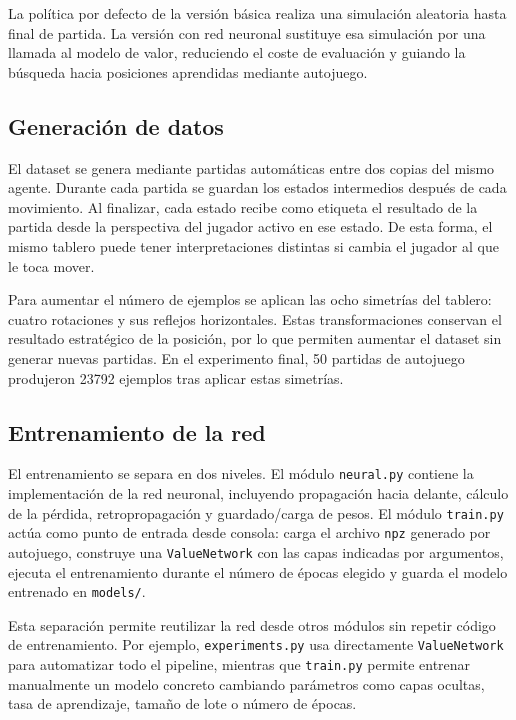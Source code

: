 \documentclass[conference,a4paper]{IEEEtran}
\begin{document}
La política por defecto de la versión básica realiza una simulación aleatoria
hasta final de partida. La versión con red neuronal sustituye esa simulación por
una llamada al modelo de valor, reduciendo el coste de evaluación y guiando la
búsqueda hacia posiciones aprendidas mediante autojuego.

\subsection{Generación de datos}

El dataset se genera mediante partidas automáticas entre dos copias del mismo
agente. Durante cada partida se guardan los estados intermedios después de cada
movimiento. Al finalizar, cada estado recibe como etiqueta el resultado de la
partida desde la perspectiva del jugador activo en ese estado. De esta forma, el
mismo tablero puede tener interpretaciones distintas si cambia el jugador al que
le toca mover.

Para aumentar el número de ejemplos se aplican las ocho simetrías del tablero:
cuatro rotaciones y sus reflejos horizontales. Estas transformaciones conservan
el resultado estratégico de la posición, por lo que permiten aumentar el dataset
sin generar nuevas partidas. En el experimento final, 50 partidas de autojuego
produjeron 23792 ejemplos tras aplicar estas simetrías.

\subsection{Entrenamiento de la red}

El entrenamiento se separa en dos niveles. El módulo \texttt{neural.py} contiene
la implementación de la red neuronal, incluyendo propagación hacia delante,
cálculo de la pérdida, retropropagación y guardado/carga de pesos. El módulo
\texttt{train.py} actúa como punto de entrada desde consola: carga el archivo
\texttt{npz} generado por autojuego, construye una \texttt{ValueNetwork} con las
capas indicadas por argumentos, ejecuta el entrenamiento durante el número de
épocas elegido y guarda el modelo entrenado en \texttt{models/}.

Esta separación permite reutilizar la red desde otros módulos sin repetir código
de entrenamiento. Por ejemplo, \texttt{experiments.py} usa directamente
\texttt{ValueNetwork} para automatizar todo el pipeline, mientras que
\texttt{train.py} permite entrenar manualmente un modelo concreto cambiando
parámetros como capas ocultas, tasa de aprendizaje, tamaño de lote o número de
épocas.
\end{document}
